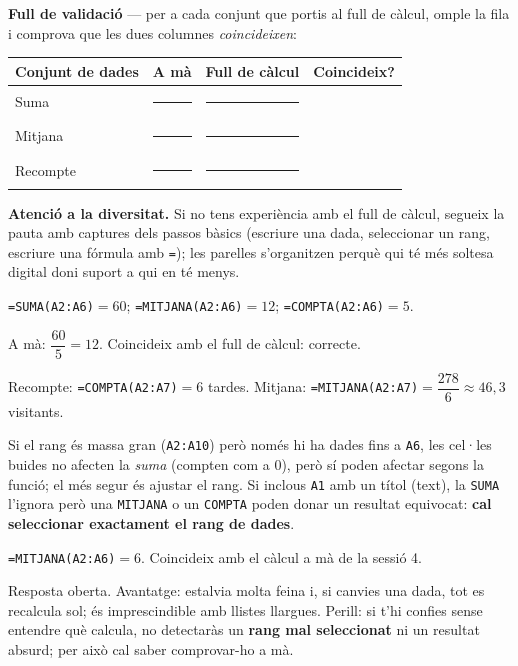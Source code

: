 \begin{idea}
\textbf{Full de validació} — per a cada conjunt que portis al full de càlcul, omple
la fila i comprova que les dues columnes \emph{coincideixen}:
\begin{center}
\renewcommand{\arraystretch}{1.4}
\begin{tabular}{p{4.6cm} c c c}
\toprule
\textbf{Conjunt de dades} & \textbf{A mà} & \textbf{Full de càlcul} & \textbf{Coincideix?} \\
\midrule
Suma & \rule{1.6cm}{0.4pt} & \rule{1.6cm}{0.4pt} & \\
Mitjana & \rule{1.6cm}{0.4pt} & \rule{1.6cm}{0.4pt} & \\
Recompte & \rule{1.6cm}{0.4pt} & \rule{1.6cm}{0.4pt} & \\
\bottomrule
\end{tabular}
\end{center}
\end{idea}

\noindent\textbf{Atenció a la diversitat.} Si no tens experiència amb el full de
càlcul, segueix la pauta amb captures dels passos bàsics (escriure una dada,
seleccionar un rang, escriure una fórmula amb \texttt{=}); les parelles s'organitzen
perquè qui té més soltesa digital doni suport a qui en té menys.

\begin{solucions}
\begin{sollist}
  \item \texttt{=SUMA(A2:A6)}$=60$; \texttt{=MITJANA(A2:A6)}$=12$;
        \texttt{=COMPTA(A2:A6)}$=5$.
  \item A mà: $\dfrac{60}{5}=12$. Coincideix amb el full de càlcul: correcte.
  \item Recompte: \texttt{=COMPTA(A2:A7)}$=6$ tardes. Mitjana:
        \texttt{=MITJANA(A2:A7)}$=\dfrac{278}{6}\approx 46,3$ visitants.
  \item Si el rang és massa gran (\texttt{A2:A10}) però només hi ha dades fins a
        \texttt{A6}, les cel·les buides no afecten la \emph{suma} (compten com a $0$),
        però sí poden afectar segons la funció; el més segur és ajustar el rang. Si
        inclous \texttt{A1} amb un títol (text), la \texttt{SUMA} l'ignora però una
        \texttt{MITJANA} o un \texttt{COMPTA} poden donar un resultat equivocat:
        \textbf{cal seleccionar exactament el rang de dades}.
  \item \texttt{=MITJANA(A2:A6)}$=6$. Coincideix amb el càlcul a mà de la sessió 4.
  \item Resposta oberta. Avantatge: estalvia molta feina i, si canvies una dada, tot
        es recalcula sol; és imprescindible amb llistes llargues. Perill: si t'hi
        confies sense entendre què calcula, no detectaràs un \textbf{rang mal
        seleccionat} ni un resultat absurd; per això cal saber comprovar-ho a mà.
\end{sollist}
\end{solucions}

